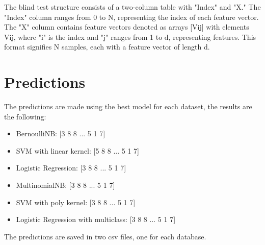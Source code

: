 \documentclass{article}
\begin{document}
\begin{titlepage}
  The blind test structure consists of a two-column table with "Index" and "X." The "Index" column ranges from 0 to N, representing the index of each feature vector. The "X" column contains feature vectors denoted as arrays [Vij] with elements Vij, where "i" is the index and "j" ranges from 1 to d, representing features. This format signifies N samples, each with a feature vector of length d.
  \newline
  \newline

  \section{Predictions}
  The predictions are made using the best model for each dataset, the results are the following:

  \begin{itemize}
    \item BernoulliNB: [3 8 8 ... 5 1 7]
    \item SVM with linear kernel: [5 8 8 ... 5 1 7]
    \item Logistic Regression: [3 8 8 ... 5 1 7]
    \item MultinomialNB: [3 8 8 ... 5 1 7]
    \item SVM with poly kernel: [3 8 8 ... 5 1 7]
    \item Logistic Regression with multiclass: [3 8 8 ... 5 1 7]
  \end{itemize}

  The predictions are saved in two csv files, one for each database.

\end{titlepage}
\end{document}
